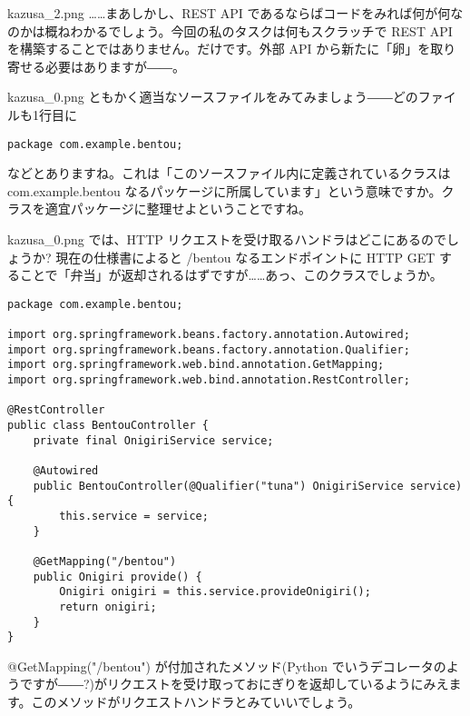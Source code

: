 \documentclass[b5paper,xelatex,ja=standard,10pt]{bxjsarticle}
\begin{document}
\begin{SERIFU}[colback=PaleIris]{kazusa_2.png}
……まあしかし、REST API であるならばコードをみれば何が何なのかは概ねわかるでしょう。今回の私のタスクは何もスクラッチで REST API を構築することではありません。{}だけです。外部 API から新たに「卵」を取り寄せる必要はありますが――。
\end{SERIFU}

\begin{SERIFU}[colback=PaleIris]{kazusa_0.png}
ともかく適当なソースファイルをみてみましょう――どのファイルも1行目に
\begin{CODE}[title=\texttt{src/main/java/com/example/bentou/BentouApplication.java}]
\begin{lstlisting}[basicstyle=\normalsize]
package com.example.bentou;
\end{lstlisting}
\end{CODE}
などとありますね。これは「このソースファイル内に定義されているクラスは com.example.bentou なるパッケージに所属しています」という意味ですか。クラスを適宜パッケージに整理せよということですね。
\end{SERIFU}

\begin{SERIFU}[colback=PaleIris]{kazusa_0.png}
では、HTTP リクエストを受け取るハンドラはどこにあるのでしょうか?  現在の仕様書によると {/bentou} なるエンドポイントに HTTP GET することで「弁当」が返却されるはずですが……あっ、このクラスでしょうか。
\begin{CODE}[title=\texttt{src/main/java/com/example/bentou/BentouController.java}]
\begin{lstlisting}[basicstyle=\normalsize]
package com.example.bentou;

import org.springframework.beans.factory.annotation.Autowired;
import org.springframework.beans.factory.annotation.Qualifier;
import org.springframework.web.bind.annotation.GetMapping;
import org.springframework.web.bind.annotation.RestController;

@RestController
public class BentouController {
    private final OnigiriService service;

    @Autowired
    public BentouController(@Qualifier("tuna") OnigiriService service) {
        this.service = service;
    }

    @GetMapping("/bentou")
    public Onigiri provide() {
        Onigiri onigiri = this.service.provideOnigiri();
        return onigiri;
    }
}
\end{lstlisting}
\end{CODE}
{@GetMapping}({"/bentou"}) が付加されたメソッド(Python でいうデコレータのようですが――?)がリクエストを受け取っておにぎりを返却しているようにみえます。このメソッドがリクエストハンドラとみていいでしょう。
\end{SERIFU}
\end{document}
